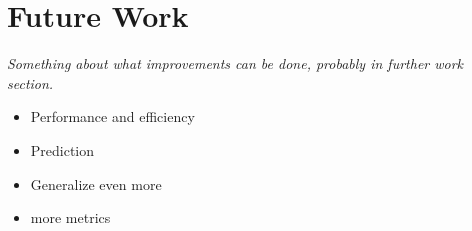 
\chapter{Future Work}

\textit{Something about what improvements can be done, probably in further work section.}

\begin{itemize}
    \item Performance and efficiency
    \item Prediction
    \item Generalize even more
    \item more metrics
\end{itemize}

\cleardoublepage